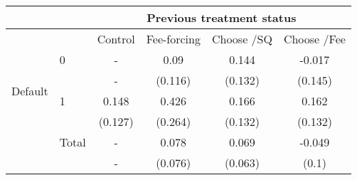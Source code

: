 \begin{tabular}{rl|cccc}
\toprule
      &       & \multicolumn{4}{c}{Previous treatment status} \\
\midrule
      &       & Control & Fee-forcing & Choose /SQ & Choose /Fee \\
\midrule
\midrule
\multicolumn{1}{c}{\multirow{4}[4]{*}{\begin{sideways}Default\end{sideways}}} & 0     & -     & 0.09  & 0.144 & -0.017 \\
      &       & -     & (0.116) & (0.132) & (0.145) \\
\cmidrule{2-6}      & 1     & 0.148 & 0.426 & 0.166 & 0.162 \\
      &       & (0.127) & (0.264) & (0.132) & (0.132) \\
\cmidrule{2-6}      & Total & -     & 0.078 & 0.069 & -0.049 \\
      &       & -     & (0.076) & (0.063) & (0.1) \\
\bottomrule
\bottomrule
\end{tabular}%
